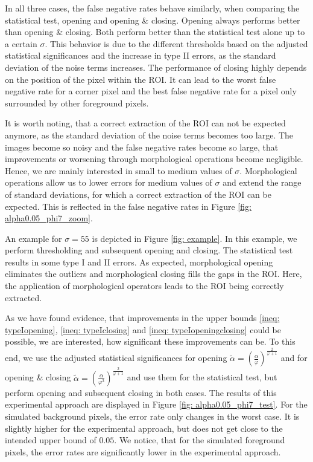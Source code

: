 \documentclass[a4paper,12pt]{article}
\theoremstyle{plain}
\theoremstyle{definition}
\numberwithin{equation}{section}
\begin{document}
In all three cases, the false negative rates behave similarly, when comparing the statistical test, opening and opening \& closing. Opening always performs better than opening \& closing. Both perform better than the statistical test alone up to a certain $\sigma$. This behavior is due to the different thresholds based on the adjusted statistical significances and the increase in type II errors, as the standard deviation of the noise terms increases. The performance of closing highly depends on the position of the pixel within the ROI. It can lead to the worst false negative rate for a corner pixel and the best false negative rate for a pixel only surrounded by other foreground pixels.



It is worth noting, that a correct extraction of the ROI can not be expected anymore, as the standard deviation of the noise terms becomes too large. The images become so noisy and the false negative rates become so large, that improvements or worsening through morphological operations become negligible. Hence, we are mainly interested in small to medium values of $\sigma$. Morphological operations allow us to lower errors for medium values of $\sigma$ and extend the range of standard deviations, for which a correct extraction of the ROI can be expected. This is reflected in the false negative rates in Figure \ref{fig: alpha0.05_phi7_zoom}.

An example for $\sigma = 55$ is depicted in Figure \ref{fig: example}. In this example, we perform thresholding and subsequent opening and closing. The statistical test results in some type I and II errors. As expected, morphological opening eliminates the outliers and morphological closing fills the gaps in the ROI. Here, the application of morphological operators leads to the ROI being correctly extracted.

As we have found evidence, that improvements in the upper bounds \eqref{ineq: typeIopening}, \eqref{ineq: typeIclosing} and \eqref{ineq: typeIopeningclosing} could be possible, we are interested, how significant these improvements can be. To this end, we use the adjusted statistical significances for opening $\tilde{\alpha} = \left( \frac{\alpha}{\varphi} \right)^{\frac{2}{\varphi + 1}}$ and for opening \& closing $\tilde{\alpha} = \left( \frac{\alpha}{\varphi^3} \right)^{\frac{2}{\varphi + 1}}$ and use them for the statistical test, but perform opening and subsequent closing in both cases. The results of this experimental approach are displayed in Figure \ref{fig: alpha0.05_phi7_test}. For the simulated background pixels, the error rate only changes in the worst case. It is slightly higher for the experimental approach, but does not get close to the intended upper bound of $0.05$. We notice, that for the simulated foreground pixels, the error rates are significantly lower in the experimental approach.
\end{document}

